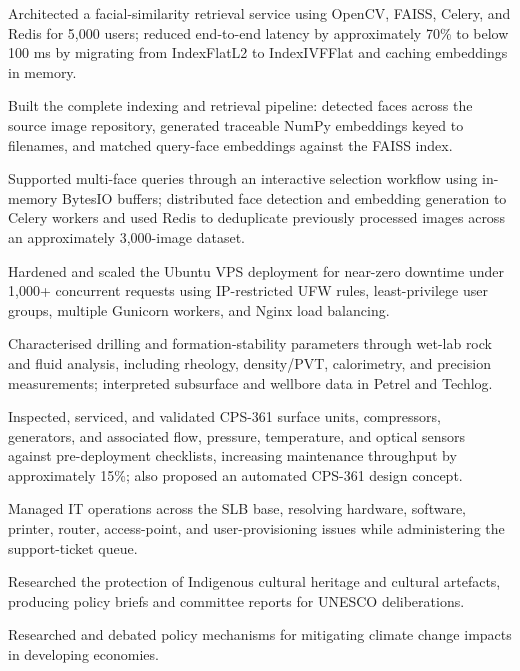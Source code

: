 \begin{details}
    \item Architected a facial-similarity retrieval service using OpenCV, FAISS, Celery, and Redis for 5{,}000 users; reduced end-to-end latency by approximately 70\% to below 100 ms by migrating from IndexFlatL2 to IndexIVFFlat and caching embeddings in memory.
    \item Built the complete indexing and retrieval pipeline: detected faces across the source image repository, generated traceable NumPy embeddings keyed to filenames, and matched query-face embeddings against the FAISS index.
    \item Supported multi-face queries through an interactive selection workflow using in-memory BytesIO buffers; distributed face detection and embedding generation to Celery workers and used Redis to deduplicate previously processed images across an approximately 3{,}000-image dataset.
    \item Hardened and scaled the Ubuntu VPS deployment for near-zero downtime under 1{,}000+ concurrent requests using IP-restricted UFW rules, least-privilege user groups, multiple Gunicorn workers, and Nginx load balancing.
\end{details}

\begin{details}
    \item Characterised drilling and formation-stability parameters through wet-lab rock and fluid analysis, including rheology, density/PVT, calorimetry, and precision measurements; interpreted subsurface and wellbore data in Petrel and Techlog.
    \item Inspected, serviced, and validated CPS-361 surface units, compressors, generators, and associated flow, pressure, temperature, and optical sensors against pre-deployment checklists, increasing maintenance throughput by approximately 15\%; also proposed an automated CPS-361 design concept.
    \item Managed IT operations across the SLB base, resolving hardware, software, printer, router, access-point, and user-provisioning issues while administering the support-ticket queue.
\end{details}

\begin{details}
    \item Researched the protection of Indigenous cultural heritage and cultural artefacts, producing policy briefs and committee reports for UNESCO deliberations.
\end{details}

\begin{details}
    \item Researched and debated policy mechanisms for mitigating climate change impacts in developing economies.
\end{details}
